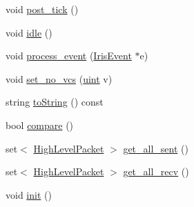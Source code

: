\begin{CompactItemize}
\item 
void \hyperlink{classGenericRPG_f980f5bdb2b703f436b00bb8a318b2fb}{post\_\-tick} ()
\item 
void \hyperlink{classGenericRPG_661b35dacbf7bae62164df5fc1b73477}{idle} ()
\item 
void \hyperlink{classGenericRPG_72d08c87beeb16514c6c81af3296f6af}{process\_\-event} (\hyperlink{classIrisEvent}{IrisEvent} $\ast$e)
\item 
void \hyperlink{classGenericRPG_0f15df71a8cb244d55a2dce961b7a972}{set\_\-no\_\-vcs} (\hyperlink{outputBuffer_8h_91ad9478d81a7aaf2593e8d9c3d06a14}{uint} v)
\item 
string \hyperlink{classGenericRPG_a4303867728559ab6e6ae3d1390ede71}{toString} () const 
\item 
bool \hyperlink{classGenericRPG_4b7a50fa77416fc8b4f16948fb4da592}{compare} ()
\item 
set$<$ \hyperlink{classHighLevelPacket}{HighLevelPacket} $>$ \hyperlink{classGenericRPG_7f855d4d69dc3f019dffdf63d29e2bf4}{get\_\-all\_\-sent} ()
\item 
set$<$ \hyperlink{classHighLevelPacket}{HighLevelPacket} $>$ \hyperlink{classGenericRPG_e6ad83dd5abf9673db6f8bd713979392}{get\_\-all\_\-recv} ()
\item 
void \hyperlink{classGenericRPG_83b1fba5595a25b24b32374ec8e85020}{init} ()
\end{CompactItemize}
